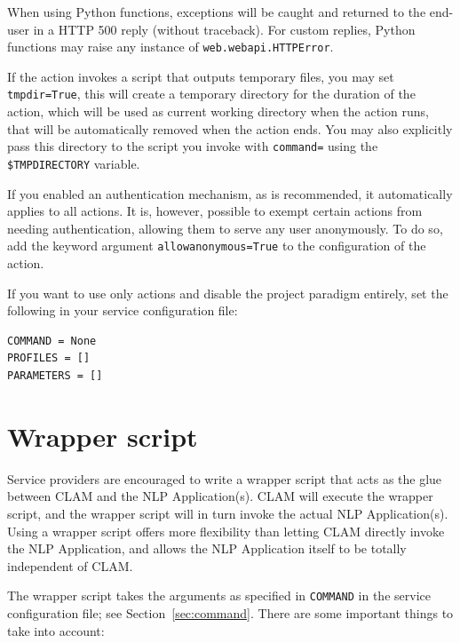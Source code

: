 \documentclass[a4paper,12pt,twoside,openright]{report}
\begin{document}
When using Python functions, exceptions will be caught and returned to the
end-user in a HTTP 500 reply (without traceback). For custom replies, Python
functions may raise any instance of \texttt{web.webapi.HTTPError}.

If the action invokes a script that outputs temporary files, you may set
\texttt{tmpdir=True}, this will create a temporary directory for the duration
of the action, which will be used as current working directory when the action
runs, that will be automatically removed when the action ends. You may also
explicitly pass this directory to the script you invoke with \texttt{command=} using the
\texttt{\$TMPDIRECTORY} variable.

If you enabled an authentication mechanism, as is recommended, it automatically
applies to all actions. It is, however, possible to exempt certain actions from
needing authentication, allowing them to serve any user anonymously. To do so, add
the keyword argument \texttt{allowanonymous=True} to the configuration of the
action. 

If you want to use only actions and disable the project paradigm
entirely, set the following in your service configuration file:

{ \small
\begin{verbatim}
COMMAND = None
PROFILES = []
PARAMETERS = []
\end{verbatim}
}


\section{Wrapper script}

Service providers are encouraged to write a wrapper script that acts as the
glue between CLAM and the NLP Application(s). CLAM will execute the wrapper
script, and the wrapper script will in turn invoke the actual NLP
Application(s). Using a wrapper script offers more flexibility than letting
CLAM directly invoke the NLP Application, and allows the NLP Application itself
to be totally independent of CLAM. 

The wrapper script takes the arguments as specified in \texttt{COMMAND} in the
service configuration file; see Section~\ref{sec:command}. There are some
important things to take into account:
\end{document}
